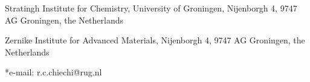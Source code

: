 \begin{affiliations}
 	\item Stratingh Institute for Chemistry, University of Groningen, Nijenborgh 4, 9747 AG Groningen, the Netherlands
 	\item Zernike Institute for Advanced Materials, Nijenborgh 4, 9747 AG Groningen, the Netherlands
	\item[] *e-mail: r.c.chiechi@rug.nl
\end{affiliations}
